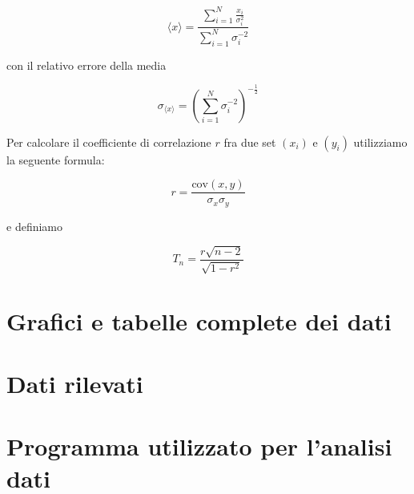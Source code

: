 \documentclass[12pt,a4paper]{article}
\begin{document}
\begin{equation}
\langle x \rangle = \frac{
\displaystyle \sum_{i=1}^N \frac{x_i}{\sigma_i^2}
}{ \displaystyle
\sum_{i=1}^N \sigma_i ^{-2}
}
\end{equation}

con il relativo errore della media

\begin{equation}
\sigma_{\langle x \rangle} = \left(
\sum_{i=1}^N \sigma_i ^{-2}
\right) ^{-\frac 12}
\end{equation}

Per calcolare il coefficiente di correlazione $r$ fra due set $(x_i)$ e $(y_i)$ utilizziamo la seguente formula:

\begin{equation}
r = \frac{\text{cov} (x, y)}{\sigma_x \sigma_y}
\end{equation}

e definiamo

\begin{equation}
T_n = \frac{r \sqrt{n-2}}{\sqrt{1-r^2}}
\end{equation}

\newpage

\section{Grafici e tabelle complete dei dati} %

\section{Dati rilevati}

\clearpage

\section{Programma utilizzato per l'analisi dati} %

\end{document}
